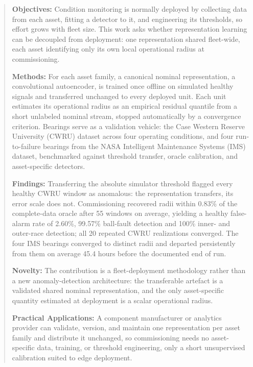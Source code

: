 \documentclass[numbered]{trbunofficial}
\begin{document}
\begin{abstract}

\textbf{Objectives:} Condition monitoring is normally deployed by collecting
data from each asset, fitting a detector to it, and engineering its
thresholds, so effort grows with fleet size. This work asks whether
representation learning can be decoupled from deployment: one representation
shared fleet-wide, each asset identifying only its own local operational
radius at commissioning.

\textbf{Methods:} For each asset family, a canonical nominal representation,
a convolutional autoencoder, is trained once offline on simulated healthy
signals and transferred unchanged to every deployed unit. Each unit estimates
its operational radius as an empirical residual quantile from a short
unlabeled nominal stream, stopped automatically by a convergence criterion.
Bearings serve as a validation vehicle: the Case Western Reserve University
(CWRU) dataset across four operating conditions, and four run-to-failure
bearings from the NASA Intelligent Maintenance Systems (IMS) dataset,
benchmarked against threshold transfer, oracle calibration, and
asset-specific detectors.

\textbf{Findings:} Transferring the absolute simulator threshold flagged
every healthy CWRU window as anomalous: the representation transfers, its
error scale does not. Commissioning recovered radii within 0.83\% of the
complete-data oracle after 55 windows on average, yielding a healthy
false-alarm rate of 2.60\%, 99.57\% ball-fault detection and 100\% inner- and
outer-race detection; all 20 repeated CWRU realizations converged. The four
IMS bearings converged to distinct radii and departed persistently from them
on average 45.4 hours before the documented end of run.

\textbf{Novelty:} The contribution is a fleet-deployment methodology rather
than a new anomaly-detection architecture: the transferable artefact is a
validated shared nominal representation, and the only asset-specific quantity
estimated at deployment is a scalar operational radius.

\textbf{Practical Applications:} A component manufacturer or analytics
provider can validate, version, and maintain one representation per asset
family and distribute it unchanged, so commissioning needs no asset-specific
data, training, or threshold engineering, only a short unsupervised
calibration suited to edge deployment.

\end{abstract}
\end{document}
